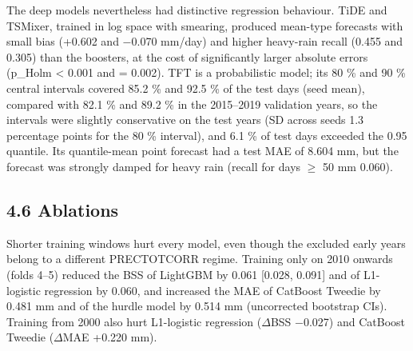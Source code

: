 \documentclass[
]{article}
\begin{document}
The deep models nevertheless had distinctive regression behaviour. TiDE and TSMixer, trained in log space with smearing, produced mean-type forecasts with small bias (+0.602 and $-$0.070 mm/day) and higher heavy-rain recall (0.455 and 0.305) than the boosters, at the cost of significantly larger absolute errors (p\_Holm \textless{} 0.001 and = 0.002).  %
TFT is a probabilistic model; its 80 \% and 90 \% central intervals covered 85.2 \% and 92.5 \% of the test days (seed mean), compared with 82.1 \% and 89.2 \% in the 2015--2019 validation years, so the intervals were slightly conservative on the test years (SD across seeds 1.3 percentage points for the 80 \% interval), and 6.1 \% of test days exceeded the 0.95 quantile.  %
Its quantile-mean point forecast had a test MAE of 8.604 mm, but the forecast was strongly damped for heavy rain (recall for days $\ge$ 50 mm 0.060).  %

\hypertarget{ablations}{%
\subsection{4.6 Ablations}\label{ablations}}

Shorter training windows hurt every model, even though the excluded early years belong to a different PRECTOTCORR regime. Training only on 2010 onwards (folds 4--5) reduced the BSS of LightGBM by 0.061 {[}0.028, 0.091{]} and of L1-logistic regression by 0.060, and increased the MAE of CatBoost Tweedie by 0.481 mm and of the hurdle model by 0.514 mm (uncorrected bootstrap CIs).  %
Training from 2000 also hurt L1-logistic regression ($\Delta$BSS $-$0.027) and CatBoost Tweedie ($\Delta$MAE +0.220 mm).  %
\end{document}
